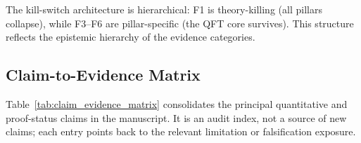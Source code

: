\documentclass[12pt,a4paper,twoside]{article}
\theoremstyle{plain}
\theoremstyle{definition}
\theoremstyle{remark}
\begin{document}
The kill-switch architecture is hierarchical: F1 is theory-killing
(all pillars collapse), while F3--F6 are pillar-specific (the QFT core
survives). This structure reflects the epistemic hierarchy of the evidence
categories.



\newpage
\subsection{Claim-to-Evidence Matrix}
\label{subsec:claim-evidence-matrix}

Table~\ref{tab:claim_evidence_matrix} consolidates the principal quantitative
and proof-status claims in the manuscript. It is an audit index, not a source
of new claims; each entry points back to the relevant limitation or
falsification exposure.
\end{document}
